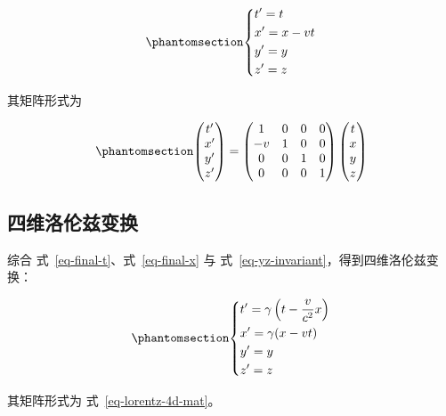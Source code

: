 \documentclass[
  chinese,
  a4paper,
  UTF8,
  12pt,
  oneside,
  openany]{ctexbook}
\theoremstyle{plain}
\theoremstyle{plain}
\theoremstyle{plain}
\theoremstyle{definition}
\theoremstyle{plain}
\theoremstyle{plain}
\theoremstyle{remark}
\begin{document}
\begin{equation}\protect\phantomsection\label{eq-galilean-4d}{
\left\{\begin{aligned}
& t' = t \\
& x' = x - vt \\
& y' = y \\
& z' = z
\end{aligned} \right.
}\end{equation}

其矩阵形式为

\begin{equation}\protect\phantomsection\label{eq-galilean-4d-mat}{
\begin{pmatrix}
t' \\ x' \\ y' \\ z'
\end{pmatrix}
=
\begin{pmatrix}
1 & 0 & 0 & 0 \\
-v & 1 & 0 & 0 \\
0 & 0 & 1 & 0 \\
0 & 0 & 0 & 1
\end{pmatrix}
\begin{pmatrix}
t \\ x \\ y \\ z
\end{pmatrix}
}\end{equation}

\subsection{四维洛伦兹变换}\label{ux56dbux7ef4ux6d1bux4f26ux5179ux53d8ux6362}

综合 式~\ref{eq-final-t}、式~\ref{eq-final-x} 与
式~\ref{eq-yz-invariant}，得到四维洛伦兹变换：

\begin{equation}\protect\phantomsection\label{eq-lorentz-4d}{
\left\{\begin{aligned}
& t' = \gamma\left(t - \frac{v}{c^{2}}x \right) \\
& x' = \gamma(x - vt) \\
& y' = y \\
& z' = z
\end{aligned} \right.
}\end{equation}

其矩阵形式为 式~\ref{eq-lorentz-4d-mat}。
\end{document}

